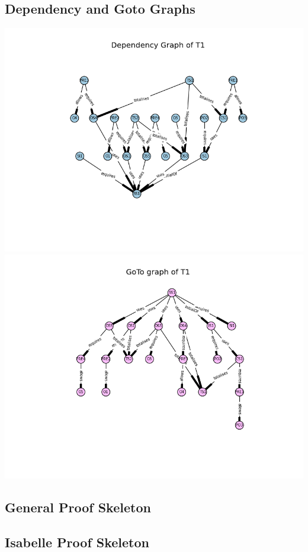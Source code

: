 \subsection{Dependency and Goto Graphs}
\label{app:bb2.5}
\includegraphics[scale=0.7]{examples/bb/25a.png}
\includegraphics[scale=0.7]{examples/bb/25b.png}
\subsection{General Proof Skeleton}
\label{app:bb3}

\subsection{Isabelle Proof Skeleton}
\label{app:bb4}

